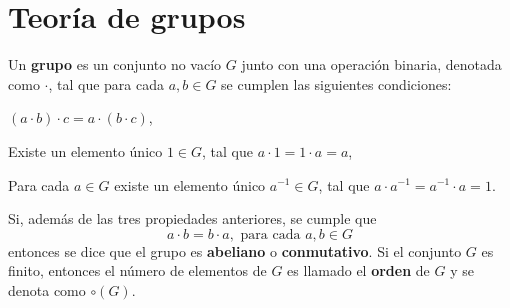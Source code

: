\section{Teoría de grupos}
\begin{definicion}
Un \textbf{grupo} es un conjunto no vacío $G$ junto con una operación binaria, denotada como $\cdot$, tal que para cada $a,b \in G$ se cumplen las siguientes condiciones:
\begin{bulletList}
\item $(a\cdot b)\cdot c = a \cdot (b\cdot c)$,
\item Existe un elemento único $1\in G$, tal que $a\cdot 1 = 1 \cdot a = a$,
\item Para cada $a\in G$ existe un elemento único $a^{-1} \in G$, tal que $a\cdot a^{-1} =a^{-1}\cdot a =1$.
\end{bulletList}
Si, además de las tres propiedades anteriores, se cumple que \[ a\cdot b = b \cdot a , \mbox{ para cada } a,b \in G \] entonces se dice que el grupo es \textbf{abeliano}  o \textbf{conmutativo}. 
Si el conjunto $G$ es finito, entonces el número de elementos de $G$ es llamado el \textbf{orden} de $G$ y se denota como $\circ(G)$. 
\end{definicion}
